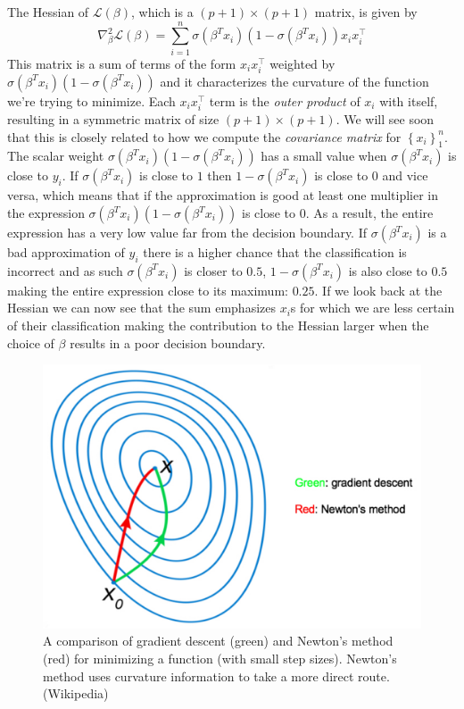 \documentclass[a4paper]{article}
\begin{document}
The Hessian of $\mathcal{L}(\beta)$, which is a $(p+1)\times(p+1)$ matrix, is given by
$$
\nabla_\beta^2 \mathcal{L}(\beta) = \sum_{i=1}^n \sigma (\beta^T x_i)\left(1-\sigma (\beta^T x_i)\right)x_i x_i^\top
$$
This matrix is a sum of terms of the form $x_i x_i^\top$ weighted by $\sigma (\beta^T x_i)\left(1-\sigma (\beta^T x_i)\right)$ and it characterizes the curvature of the function we're trying to minimize. Each $x_i x_i^\top$ term is the \textit{outer product} of $x_i$ with itself, resulting in a symmetric matrix of size $(p+1)\times(p+1)$.  We will see soon that this is closely related to how we compute the \emph{covariance matrix} for $\left\{x_i\right\}_1^n$. The scalar weight $\sigma (\beta^T x_i)\left(1-\sigma (\beta^T x_i)\right)$ has a small value when $\sigma(\beta^T x_i)$ is close to $y_i$. If $\sigma (\beta^T x_i)$ is close to $1$ then $1-\sigma (\beta^T x_i)$ is close to $0$ and vice versa, which means that if the approximation is good at least one multiplier in the expression $\sigma (\beta^T x_i)\left(1-\sigma (\beta^T x_i)\right)$ is close to $0$. As a result, the entire expression has a very low value far from the decision boundary. If $\sigma (\beta^T x_i)$ is a bad approximation of $y_i$ there is a higher chance that the classification is incorrect and as such $\sigma (\beta^T x_i)$ is closer to $0.5$, $1 - \sigma (\beta^T x_i)$ is also close to $0.5$ making the entire expression close to its maximum: $0.25$. If we look back at the Hessian we can now see that the sum emphasizes $x_i$s for which we are less certain of their classification making the contribution to the Hessian  larger when the choice of $\beta$ results in a poor decision boundary. 

\begin{figure}
\centering
\includegraphics[width=1\textwidth]{Newton_s_Optimization.jpg}
\caption{A comparison of gradient descent (green) and Newton's method (red) for minimizing a function (with small step sizes). Newton's method uses curvature information to take a more direct route. (Wikipedia)}
\label{fig:newton3}
\end{figure}
\end{document}
